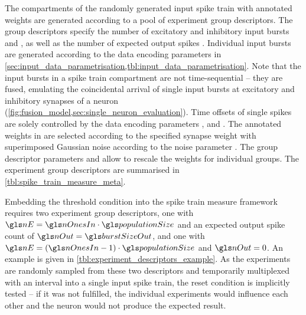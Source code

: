 The compartments of the randomly generated input spike train \tIn with annotated weights \wIn are generated according to a pool of experiment group descriptors. The group descriptors specify the number of excitatory and inhibitory input bursts \nE and \nI, as well as the number of expected output spikes \nOut. Individual input bursts are generated according to the data encoding parameters in \cref{sec:input_data_parametrisation,tbl:input_data_parametrisation}. Note that the input bursts in a spike train compartment are not time-sequential -- they are fused, emulating the coincidental arrival of single input bursts at \nE excitatory and \nI inhibitory synapses of a neuron (\cref{fig:fusion_model,sec:single_neuron_evaluation}). Time offsets of single spikes are solely controlled by the data encoding parameters \jitter, \jitterOffs and \isi. The annotated weights in \wIn are selected according to the specified synapse weight \wsyn with superimposed Gaussian noise according to the noise parameter \jitterWSyn. The group descriptor parameters \wE and \wI allow to rescale the weights for individual groups. The experiment group descriptors are summarised in  \cref{tbl:spike_train_measure_meta}.

Embedding the \BiNAM threshold condition into the spike train measure framework requires two experiment group descriptors, one with $\nE = \nOnesIn \cdot \populationSize$ and an expected output spike count of $\nOut = \burstSizeOut$, and one with $\nE = (\nOnesIn - 1) \cdot \populationSize$ and $\nOut = 0$. An example is given in \cref{tbl:experiment_descriptors_example}. As the \Ngroups experiments are randomly sampled from these two descriptors and temporarily multiplexed with an interval \timeWindow into a single input spike train, the reset condition is implicitly tested -- if it was not fulfilled, the individual experiments would influence each other and the neuron would not produce the expected result.

